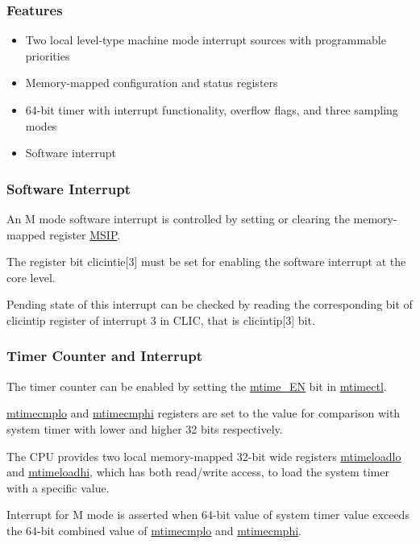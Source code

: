 \documentclass[main\_\_EN.tex]{subfiles}
\begin{document}
\subsubsection{Features}
\begin{itemize}
    \item Two local level-type machine mode interrupt sources with programmable priorities
    \item Memory-mapped configuration and status registers
    \item 64-bit timer with interrupt functionality, overflow flags, and three sampling modes
    \item Software interrupt
\end{itemize}

\subsubsection{Software Interrupt}
\label{sec:riscvcpu-clint-software}

An M mode software interrupt is controlled by setting or clearing the memory-mapped register \hyperref[regdesc:CLINTMSIPREG]{MSIP}.

The register bit clicintie[3] must be set for enabling the software interrupt at the core level.

Pending state of this interrupt can be checked by reading the corresponding bit of clicintip register of interrupt 3 in CLIC, that is clicintip[3] bit.


\subsubsection{Timer Counter and Interrupt}
\label{sec:riscvcpu-clint-timer}

The timer counter can be enabled by setting the \hyperref[fielddesc:CLINTMTIMECTLEN]{mtime\_EN} bit in  \hyperref[regdesc:CLINTMTIMECTLREG]{mtimectl}.

\hyperref[regdesc:CLINTMTIMECMPLOREG]{mtimecmplo} and \hyperref[regdesc:CLINTMTIMECMPHIREG]{mtimecmphi} registers are set to the value for comparison with system timer with lower and higher 32 bits respectively.

The CPU provides two local memory-mapped 32-bit wide registers \hyperref[regdesc:CLINTMTIMELOADLOREG]{mtimeloadlo} and \hyperref[regdesc:CLINTMTIMELOADHIREG]{mtimeloadhi}, which has both read/write access, to load the system timer with a specific value.

Interrupt for M mode is asserted when 64-bit value of system timer value exceeds the 64-bit combined value of \hyperref[regdesc:CLINTMTIMECMPLOREG]{mtimecmplo} and \hyperref[regdesc:CLINTMTIMECMPHIREG]{mtimecmphi}.
\end{document}
